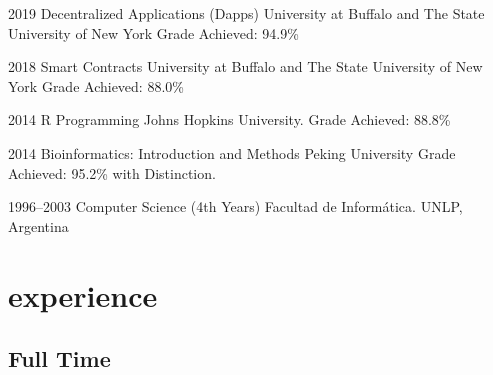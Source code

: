 \documentclass[]{friggeri-cv} %
\begin{document}
\begin{entrylist}


\entry
{2019}
{Decentralized Applications (Dapps)}
{University at Buffalo and The State University of New York}
{Grade Achieved: 94.9\%}


\entry
{2018}
{Smart Contracts}
{University at Buffalo and The State University of New York}
{Grade Achieved: 88.0\%}


\entry
{2014}
{R Programming}
{Johns Hopkins University.}
{Grade Achieved: 88.8\%}


\entry
{2014}
{Bioinformatics: Introduction and Methods}
{Peking University}
{Grade Achieved: 95.2\% with Distinction.}


\entry
{1996--2003}
{Computer Science (4th Years)}
{Facultad de Informática. UNLP, Argentina}


\end{entrylist}


\section{experience}

\subsection{Full Time}
\end{document}
